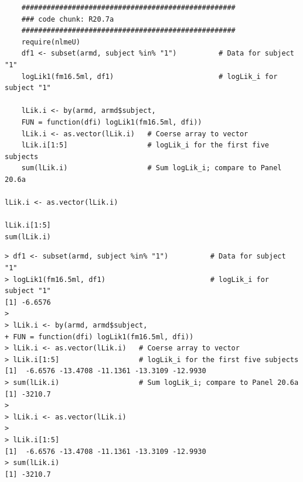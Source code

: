 \documentclass[a4paper,12pt]{article}
\begin{document}

\begin{framed}
	\begin{verbatim}
	###################################################
	### code chunk: R20.7a
	###################################################
	require(nlmeU)  
	df1 <- subset(armd, subject %in% "1")          # Data for subject "1" 
	logLik1(fm16.5ml, df1)                         # logLik_i for subject "1" 
	
	lLik.i <- by(armd, armd$subject,
	FUN = function(dfi) logLik1(fm16.5ml, dfi))
	lLik.i <- as.vector(lLik.i)   # Coerse array to vector  
	lLik.i[1:5]                   # logLik_i for the first five subjects
	sum(lLik.i)                   # Sum logLik_i; compare to Panel 20.6a
	
lLik.i <- as.vector(lLik.i)

lLik.i[1:5]
sum(lLik.i)

\end{verbatim}
\end{framed}
\begin{verbatim}
> df1 <- subset(armd, subject %in% "1")          # Data for subject "1" 
> logLik1(fm16.5ml, df1)                         # logLik_i for subject "1" 
[1] -6.6576
> 
> lLik.i <- by(armd, armd$subject,
+ FUN = function(dfi) logLik1(fm16.5ml, dfi))
> lLik.i <- as.vector(lLik.i)   # Coerse array to vector  
> lLik.i[1:5]                   # logLik_i for the first five subjects
[1]  -6.6576 -13.4708 -11.1361 -13.3109 -12.9930
> sum(lLik.i)                   # Sum logLik_i; compare to Panel 20.6a
[1] -3210.7
> 
> lLik.i <- as.vector(lLik.i)
> 
> lLik.i[1:5]
[1]  -6.6576 -13.4708 -11.1361 -13.3109 -12.9930
> sum(lLik.i)
[1] -3210.7

\end{verbatim}
\end{document}
